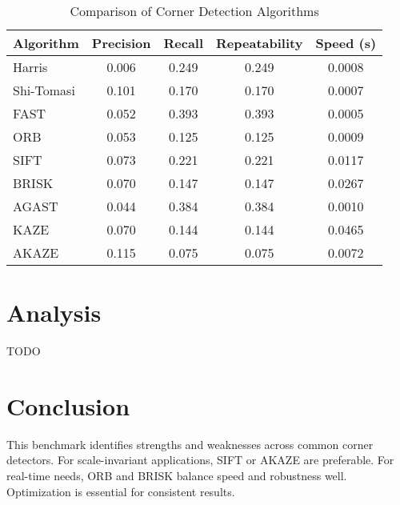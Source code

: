 \documentclass[journal]{IEEEtran}
\begin{document}
\begin{table}[h]
    \centering
    \caption{Comparison of Corner Detection Algorithms}
    \label{tab:corner_detection_comparison}
    \begin{tabular}{|l|c|c|c|c|}
        \hline
        \textbf{Algorithm} & \textbf{Precision} & \textbf{Recall} & \textbf{Repeatability} & \textbf{Speed (s)} \\
        \hline
        Harris & 0.006 & 0.249 & 0.249 & 0.0008 \\
        Shi-Tomasi & 0.101 & 0.170 & 0.170 & 0.0007 \\
        FAST & 0.052 & 0.393 & 0.393 & 0.0005 \\
        ORB & 0.053 & 0.125 & 0.125 & 0.0009 \\
        SIFT & 0.073 & 0.221 & 0.221 & 0.0117 \\
        BRISK & 0.070 & 0.147 & 0.147 & 0.0267 \\
        AGAST & 0.044 & 0.384 & 0.384 & 0.0010 \\
        KAZE & 0.070 & 0.144 & 0.144 & 0.0465 \\
        AKAZE & 0.115 & 0.075 & 0.075 & 0.0072 \\
        \hline
    \end{tabular}
\end{table}

\section{Analysis}
TODO

\section{Conclusion}
This benchmark identifies strengths and weaknesses across common corner detectors. For scale-invariant applications, SIFT or AKAZE are preferable. For real-time needs, ORB and BRISK balance speed and robustness well. Optimization is essential for consistent results.




\end{document}
